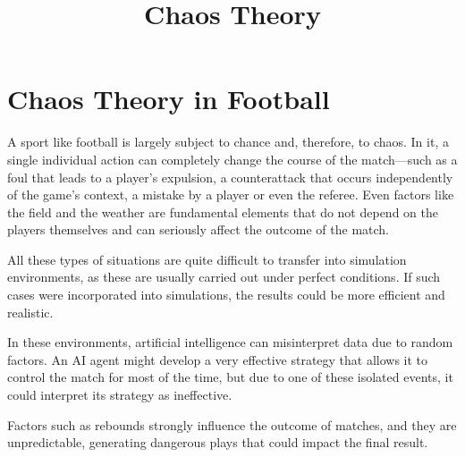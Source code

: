 \documentclass[12pt]{article}
\title{Chaos Theory \\ \small }
\author{}
\date{}
\begin{document}
\maketitle


\section*{Chaos Theory in Football}

A sport like football is largely subject to chance and, therefore, to chaos. In it, a single individual action can completely change the course of the match—such as a foul that leads to a player's expulsion, a counterattack that occurs independently of the game's context, a mistake by a player or even the referee. Even factors like the field and the weather are fundamental elements that do not depend on the players themselves and can seriously affect the outcome of the match.

All these types of situations are quite difficult to transfer into simulation environments, as these are usually carried out under perfect conditions. If such cases were incorporated into simulations, the results could be more efficient and realistic.

In these environments, artificial intelligence can misinterpret data due to random factors. An AI agent might develop a very effective strategy that allows it to control the match for most of the time, but due to one of these isolated events, it could interpret its strategy as ineffective.

Factors such as rebounds strongly influence the outcome of matches, and they are unpredictable, generating dangerous plays that could impact the final result.
\end{document}
